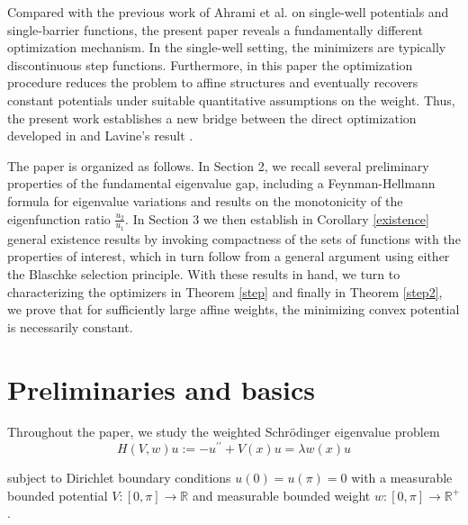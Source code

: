 \documentclass[12pt,a4paper]{amsart}
\begin{document}

Compared with the previous work of Ahrami et al. \cite{AHRA} on single-well potentials and single-barrier functions, the present paper
reveals a fundamentally different optimization mechanism. In the
single-well setting, the minimizers are typically discontinuous step
functions. Furthermore, in this paper the
optimization procedure reduces the problem to affine structures and eventually
recovers constant potentials under suitable quantitative assumptions on the
weight. Thus, the present work establishes a new bridge between the direct
optimization developed in \cite{ElAHar,
AHRA} and Lavine's result \cite{Lavine}.

The paper is organized as follows. In Section 2, we recall several preliminary properties of the fundamental eigenvalue gap, including a Feynman-Hellmann formula for eigenvalue variations and results on the monotonicity of the eigenfunction ratio $\frac{u_2}{u_1}$. In Section 3 we then establish in Corollary \ref{existence} general existence results by invoking compactness of the sets of functions with the properties of interest,
which in turn follow from a general argument using either the Blaschke selection principle. With these results in hand, we turn to characterizing the optimizers in Theorem \ref{step} and finally in Theorem \ref{step2}, we prove that for sufficiently large affine weights, the minimizing convex potential is necessarily constant.  








\section{Preliminaries and basics}
Throughout the paper, we study the weighted Schr\"{o}dinger eigenvalue problem
\begin{equation*}\label{eq}
H(V,w) u :=  -u^{\prime \prime} +V(x) u  = \lambda  w(x) u
\end{equation*}

subject to Dirichlet boundary conditions $u(0)=u(\pi)=0$
with a measurable bounded potential $V:[0,\pi] \longrightarrow
 \mathbb{R}$ and measurable bounded weight $w:[0,\pi] \longrightarrow
 \mathbb{R^+}$.
\end{document}
